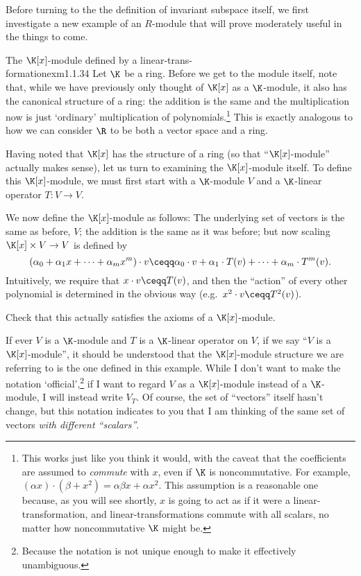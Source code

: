 Before turning to the the definition of invariant subspace itself, we first investigate a new example of an $R$-module that will prove moderately useful in the things to come.
\begin{exm}{The $\K [x]$-module defined by a linear-trans-\\formation}{exm1.1.34}
	Let $\K$ be a ring.  Before we get to the module itself, note that, while we have previously only thought of $\K [x]$ as a $\K$-module, it also has the canonical structure of a ring:  the addition is the same and the multiplication now is just `ordinary' multiplication of polynomials.\footnote{This works just like you think it would, with the caveat that the coefficients are assumed to \emph{commute} with $x$, even if $\K$ is noncommutative.  For example, $(\alpha x)\cdot (\beta +x^2)=\alpha \beta x+\alpha x^2$.  This assumption is a reasonable one because, as you will see shortly, $x$ is going to act as if it were a linear-transformation, and linear-transformations commute with all scalars, no matter how noncommutative $\K$ might be.}  This is exactly analogous to how we can consider $\R$ to be both a vector space and a ring.
	
	Having noted that $\K [x]$ has the structure of a ring (so that ``$\K [x]$-module'' actually makes sense), let us turn to examining the $\K [x]$-module itself.  To define this $\K [x]$-module, we must first start with a $\K$-module $V$ and a $\K$-linear operator $T\colon V\rightarrow V$.
	
	We now define the $\K [x]$-module as follows:  The underlying set of vectors is the same as before, $V$; the addition is the same as it was before; but now scaling $\K [x]\times V\rightarrow V$ is defined by
	\begin{equation}
	(\alpha _0+\alpha _1x+\cdots +\alpha _mx^m)\cdot v\ceqq \alpha _0\cdot v+\alpha _1\cdot T(v)+\cdots +\alpha _m\cdot T^m(v).
	\end{equation}
	Intuitively, we require that $x\cdot v\ceqq T(v)$, and then the ``action'' of every other polynomial is determined in the obvious way (e.g.~$x^2\cdot v\ceqq T^2(v)$).
	\begin{exr}[breakable=false]{}{}
		Check that this actually satisfies the axioms of a $\K [x]$-module.
	\end{exr}
	\begin{rmk}
		If ever $V$ is a $\K$-module and $T$ is a $\K$-linear operator on $V$, if we say ``$V$ is a $\K [x]$-module'', it should be understood that the $\K [x]$-module structure we are referring to is the one defined in this example.  While I don't want to make the notation `official',\footnote{Because the notation is not unique enough to make it effectively unambiguous.} if I want to regard $V$ as a $\K [x]$-module instead of a $\K$-module, I will instead write $V_T$.  Of course, the set of ``vectors'' itself hasn't change, but this notation indicates to you that I am thinking of the same set of vectors \emph{with different ``scalars''}.
	\end{rmk}
\end{exm}

